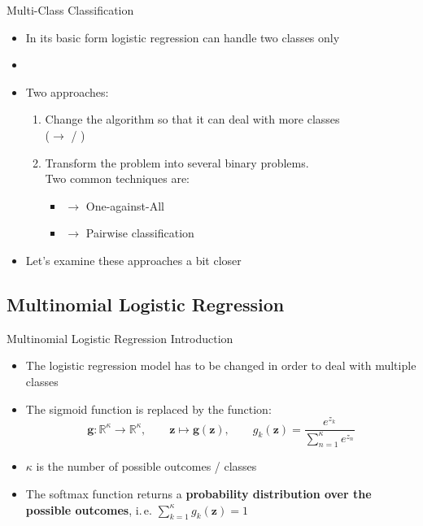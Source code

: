 \begin{frame}{Multi-Class Classification}{}
	\begin{itemize}
		\item In its basic form logistic regression can handle two classes only
		\item {}
		\item Two approaches:
		\begin{enumerate}
			\item Change the algorithm so that it can deal with more classes \\
				($\rightarrow$  / )
			\item Transform the problem into several binary problems. \\
				Two common techniques are:
			\begin{itemize}
				\item {} 	$\rightarrow$ One-against-All
				\item {} 	$\rightarrow$ Pairwise classification
			\end{itemize}
		\end{enumerate}
		\item Let's examine these approaches a bit closer
	\end{itemize}
\end{frame}


\subsection{Multinomial Logistic Regression}

\begin{frame}{Multinomial Logistic Regression Introduction}{}\optional
	\begin{itemize}
		\item The logistic regression model has to be changed in order to deal with multiple classes
		\item The sigmoid function is replaced by the  function:
		\begin{equation}
			\bm{g} : \mathbb{R}^{\kappa} \rightarrow \mathbb{R}^{\kappa}, \qquad \bm{z} \mapsto \bm{g}(\bm{z}), \qquad
			g_k(\bm{z}) = \frac{e^{z_k}}{\sum_{n=1}^{\kappa} e^{z_n}}
		\end{equation}
		\item $\kappa$ is the number of possible outcomes / classes
		\item The softmax function returns a \textbf{probability distribution over the possible outcomes}, i.\,e. $\sum_{k=1}^{\kappa} g_k(\bm{z}) = 1$
	\end{itemize}
\end{frame}


